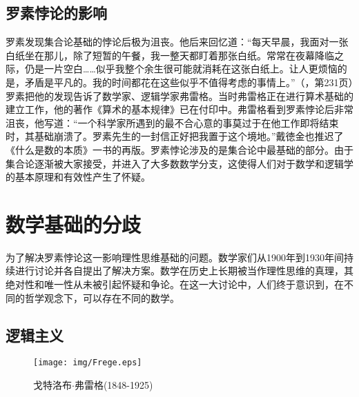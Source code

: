 \documentclass{article}
\begin{document}
\subsection{罗素悖论的影响}

罗素发现集合论基础的悖论后极为沮丧。他后来回忆道：“每天早晨，我面对一张白纸坐在那儿，除了短暂的午餐，我一整天都盯着那张白纸。常常在夜幕降临之际，仍是一片空白……似乎我整个余生很可能就消耗在这张白纸上。让人更烦恼的是，矛盾是平凡的。我的时间都花在这些似乎不值得考虑的事情上。”（\cite{HanXueTao16}，第231页）罗素把他的发现告诉了数学家、逻辑学家弗雷格。当时弗雷格正在进行算术基础的建立工作，他的著作《算术的基本规律》已在付印中。弗雷格看到罗素悖论后非常沮丧，他写道：“一个科学家所遇到的最不合心意的事莫过于在他工作即将结束时，其基础崩溃了。罗素先生的一封信正好把我置于这个境地。”戴徳金也推迟了《什么是数的本质》一书的再版。罗素悖论涉及的是集合论中最基础的部分。由于集合论逐渐被大家接受，并进入了大多数数学分支，这使得人们对于数学和逻辑学的基本原理和有效性产生了怀疑。

\begin{Exercise}
\end{Exercise}

\section{数学基础的分歧}

为了解决罗素悖论这一影响理性思维基础的问题。数学家们从1900年到1930年间持续进行讨论并各自提出了解决方案。数学在历史上长期被当作理性思维的真理，其绝对性和唯一性从未被引起怀疑和争论。在这一大讨论中，人们终于意识到，在不同的哲学观念下，可以存在不同的数学。

\subsection{逻辑主义}

\begin{wrapfigure}{L}{0.3\textwidth}
 \centering
 \texttt{[image: img/Frege.eps]}
 \captionsetup{labelformat=empty}
 \caption{戈特洛布$\cdot$弗雷格(1848-1925)}
 \label{fig:Frege}
\end{wrapfigure}
\end{document}

